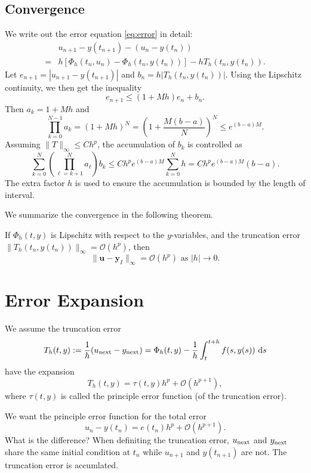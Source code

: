 \documentclass[10pt]{amsart}
\begin{document}
\subsection{Convergence} We write out the error equation \eqref{eq:error} in detail:
\begin{equation}
\begin{aligned}
&u_{n+1} - y(t_{n+1}) - (u_n - y(t_n))\\
={}& h \left [ \Phi_h(t_n, u_n) - \Phi_h(t_n, y(t_n)) \right ] - hT_h(t_n, y(t_n)). 
\end{aligned}
\end{equation}
Let $e_{n+1} = |u_{n+1} - y(t_{n+1})|$ and $b_n = h  |T_h(t_n, y(t_n))|$. Using the Lipschitz continuity, we then get the inequality
$$
e_{n+1} \leq (1+ Mh)e_n + b_n.
$$
Then $a_k = 1 + Mh$ and
$$
\prod_{k=0}^{N-1} a_k = (1 + Mh)^N = \left (1 + \frac{M(b-a)}{N}\right )^N \leq e^{(b-a)M}.
$$
Assuming $\|T\|_{\infty}\leq Ch^p$, the accumulation of $b_k$ is controlled as
$$
\sum_{k=0}^{N}\left(\prod_{\ell=k+1}^{N} a_{\ell}\right) b_k \leq Ch^p e^{(b-a)M} \sum_{k=0}^{N} h = Ch^p e^{(b-a)M}(b-a).
$$
The extra factor $h$ is used to ensure the accumulation is bounded by the length of interval.

We summarize the convergence in the following theorem.
\begin{theorem}
 If ${\Phi}_h(t, y)$ is Lipschitz with respect to the $y$-variables, and the truncation error $\|T_h(t_n, y(t_n))\|_{\infty}= \mathcal O(h^p)$, then
 $$
\|\boldsymbol{u}-\boldsymbol{y}_I\|_{\infty}=\mathcal O\left(h^p\right) \text { as }|h| \rightarrow 0.
$$
\end{theorem}


\section{Error Expansion}
We assume the truncation error
\begin{equation}\label{eq:Tphi}  
T_h(t, y) := \frac{1}{h}(u_{\rm next} - y_{\rm next}) =  \Phi_h(t, y) - \frac{1}{h} \int_{t}^{t+h} f(s, y(s)) \, \,{\rm d} s
\end{equation}  
have the expansion
$$
T_h(t, y) = \tau(t, y) h^p + \mathcal O(h^{p+1}),
$$
where $\tau(t,y)$ is called the principle error function (of the truncation error). 

We want the principle error function for the total error
$$
u_n - y(t_n) = e(t_n) h^p + \mathcal O(h^{p+1}).
$$
What is the difference? When definiting the truncation error, $u_{\rm next}$ and $y_{\rm next}$ share the same initial condition at $t_n$ while $u_{n+1}$ and $y(t_{n+1})$ are not. The truncation error is accumlated. 
\end{document}
